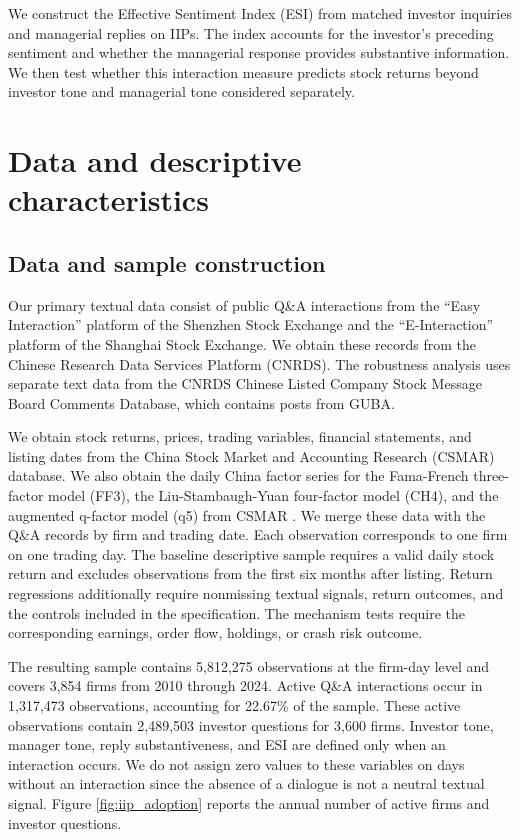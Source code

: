 \documentclass[12pt]{article}
\begin{document}
We construct the Effective Sentiment Index (ESI) from matched investor inquiries and managerial replies on IIPs. The index accounts for the investor's preceding sentiment and whether the managerial response provides substantive information. We then test whether this interaction measure predicts stock returns beyond investor tone and managerial tone considered separately.



\section{Data and descriptive characteristics}\label{sec:data}

\subsection{Data and sample construction}

Our primary textual data consist of public Q\&A interactions from the ``Easy Interaction'' platform of the Shenzhen Stock Exchange and the ``E-Interaction'' platform of the Shanghai Stock Exchange. We obtain these records from the Chinese Research Data Services Platform (CNRDS). The robustness analysis uses separate text data from the CNRDS Chinese Listed Company Stock Message Board Comments Database, which contains posts from GUBA.

We obtain stock returns, prices, trading variables, financial statements, and listing dates from the China Stock Market and Accounting Research (CSMAR) database. We also obtain the daily China factor series for the Fama-French three-factor model (FF3), the Liu-Stambaugh-Yuan four-factor model (CH4), and the augmented q-factor model (q5) from CSMAR \citep{fama1993common,hou2021,liu2019}. We merge these data with the Q\&A records by firm and trading date. Each observation corresponds to one firm on one trading day. The baseline descriptive sample requires a valid daily stock return and excludes observations from the first six months after listing. Return regressions additionally require nonmissing textual signals, return outcomes, and the controls included in the specification. The mechanism tests require the corresponding earnings, order flow, holdings, or crash risk outcome.

The resulting sample contains 5,812,275 observations at the firm-day level and covers 3,854 firms from 2010 through 2024. Active Q\&A interactions occur in 1,317,473 observations, accounting for 22.67\% of the sample. These active observations contain 2,489,503 investor questions for 3,600 firms. Investor tone, manager tone, reply substantiveness, and ESI are defined only when an interaction occurs. We do not assign zero values to these variables on days without an interaction since the absence of a dialogue is not a neutral textual signal. Figure \ref{fig:iip_adoption} reports the annual number of active firms and investor questions.
\end{document}
